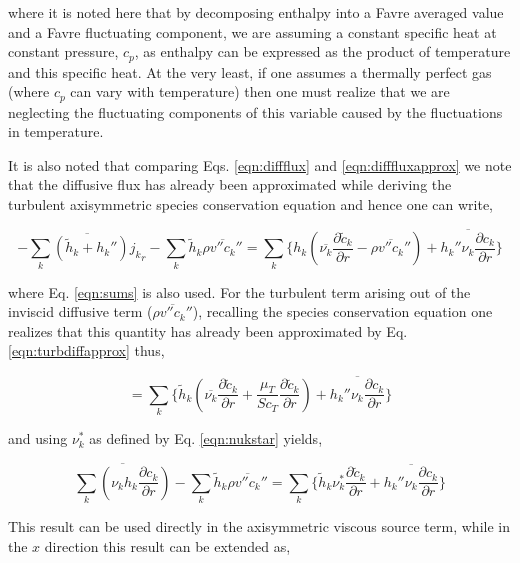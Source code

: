 	where it is noted here that by decomposing enthalpy into a Favre averaged value and a Favre fluctuating
component, we are assuming a constant specific heat at constant pressure, $c_p$, as enthalpy can be 
expressed as the product of temperature and this specific heat.  At the very least, if one assumes a thermally perfect
gas (where $c_p$ can vary with temperature) then one must realize that we are neglecting the fluctuating components 
of this variable caused by the fluctuations in temperature.  

	It is also noted that comparing 
Eqs. \ref{eqn:diffflux} and \ref{eqn:difffluxapprox} we note that the diffusive flux has already been 
approximated while deriving the turbulent axisymmetric species conservation equation and hence one can write, 

\begin{displaymath}
	-\overline{\sum_{k}(\tilde h_k + h_k''){j_k}_r} - \sum_k \tilde h_k \overline{\rho v'' c_k''} =
	\sum_{k}\Big\{h_k (\overline{\nu_k} \frac{\partial \tilde c_k}{\partial r} - \overline{\rho v'' c_k''})
	+ \overline{h_k'' \nu_k \frac{\partial c_k}{\partial r}}\Big\}
\end{displaymath}

	where Eq. \ref{eqn:sums} is also used.  For the turbulent term arising out of the inviscid diffusive
term ($\overline{\rho v'' c_k''}$), recalling the species conservation equation one realizes that this quantity
has already been approximated by Eq. \ref{eqn:turbdiffapprox} thus,

\begin{displaymath}
	=\sum_{k}\Big\{\tilde h_k (\overline{\nu_k} \frac{\partial \tilde c_k}{\partial r} + \frac{\mu_T}{Sc_T}
	\frac{\partial \tilde c_k}{\partial r})
	+ \overline{h_k'' \nu_k \frac{\partial c_k}{\partial r}}\Big\}
\end{displaymath}

	and using $\nu_k^*$ as defined by Eq. \ref{eqn:nukstar} yields,

\begin{equation}
	\overline{\sum_k (\nu_k h_k\frac{\partial c_k}{\partial r})} - \sum_k \tilde h_k \overline{\rho v'' c_k''} =
	\sum_{k}\Big\{\tilde h_k \nu_k^* \frac{\partial \tilde c_k}{\partial r} 
	+ \overline{h_k'' \nu_k \frac{\partial c_k}{\partial r}}\Big\}
\label{eqn:rdiffturb}
\end{equation}

	This result can be used directly in the axisymmetric viscous source term, while in the $x$ direction 
this result can be extended as,


